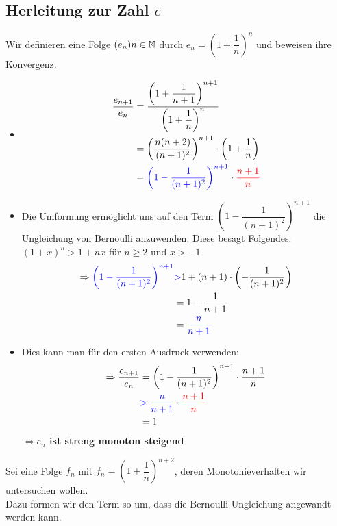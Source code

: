 \documentclass[main.tex]{subfiles}
\begin{document}
	\subsection{Herleitung zur Zahl $e$}

Wir definieren eine Folge $(e_{n})n\in\mathbb{N}$ durch $e_{n}=\left(1+\dfrac{1}{n}\right)^n$ und beweisen ihre Konvergenz.

\begin{itemize}

\item\begin{align*}\dfrac{e_{n+1}}{e_{n}}&=\dfrac{{\left(1+\dfrac{1}{n+1}\right)}^{n+1}}{{\left(1+\dfrac{1}{n}\right)}^{n}}\\
&=\left(\dfrac{n(n+2)}{(n+1)^2}\right)^{n+1}\cdot\left(1+\dfrac{1}{n}\right)\\
&=\textcolor{blue}{\left(1-\dfrac{1}{(n+1)^2}\right)^{n+1}}\cdot\textcolor{red}{\dfrac{n+1}{n}}
\end{align*}

\item Die Umformung ermöglicht uns auf den Term $\left(1-\dfrac{1}{(n+1)^2}\right)^{n+1}$ die Ungleichung von Bernoulli anzuwenden. Diese besagt Folgendes: $(1+x)^n>1+nx$ für $n\geq2$ und $x>-1$\\
\begin{align*}\Rightarrow\textcolor{blue}{\left(1-\dfrac{1}{(n+1)^2}\right)^{n+1}}&\textcolor{blue}{>} 1+(n+1)\cdot\left(-\dfrac{1}{(n+1)^2}\right)\\
&=1-\dfrac{1}{n+1}\\
&=\textcolor{blue}{\dfrac{n}{n+1}}
\end{align*}

\item Dies kann man für den ersten Ausdruck verwenden:\\
\begin{align*}
\Rightarrow\dfrac{e_{n+1}}{e_{n}}&=\left(1-\dfrac{1}{(n+1)^2}\right)^{n+1}\cdot\dfrac{n+1}{n}\\
&\textcolor{blue}{>\dfrac{n}{n+1}}\cdot\textcolor{red}{\dfrac{n+1}{n}}\\
&=1
\end{align*}
\textbf{$\Leftrightarrow e_{n}$ ist streng monoton steigend}
\end{itemize}

Sei eine Folge $f_{n}$ mit $f_{n}=\left(1+\dfrac{1}{n}\right)^{n+2}$, deren Monotonieverhalten wir untersuchen wollen.\\
Dazu formen wir den Term so um, dass die Bernoulli-Ungleichung angewandt werden kann.
\end{document}
